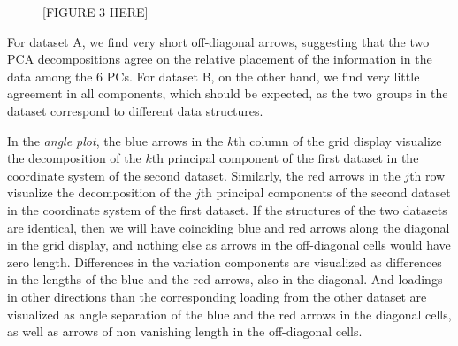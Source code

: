 \documentclass[a4paper,14pt]{article}
\begin{document}
\begin{figure}[!h]
\caption{[FIGURE 3 HERE]}
\label{plot.simAngle}
\end{figure}

For dataset A, we find very short off-diagonal arrows, suggesting that the two PCA decompositions agree on the relative placement of the information in  the data among the 6 PCs.  For dataset B, on the other hand, we find very little agreement in all components, which should be expected, as the two groups in the dataset correspond to different data structures.

In the \emph{angle plot}, the blue arrows in the $k$th column of the grid display visualize the decomposition of the $k$th principal component of the first dataset in the coordinate system of the second dataset. Similarly, the red arrows in the $j$th row visualize the decomposition of the $j$th principal components of the second dataset in the coordinate system of the first dataset. If the structures of the two datasets are identical, then we will have coinciding blue and red arrows along the diagonal in the grid display, and nothing else as arrows in the off-diagonal cells would have zero length. Differences in the variation components are visualized as differences in the lengths of the blue and the red arrows, also in the diagonal. And loadings in other directions than the corresponding loading from the other dataset are visualized as angle separation of the blue and the red arrows in the diagonal cells, as well as arrows of non vanishing length in the off-diagonal cells.
\end{document}
